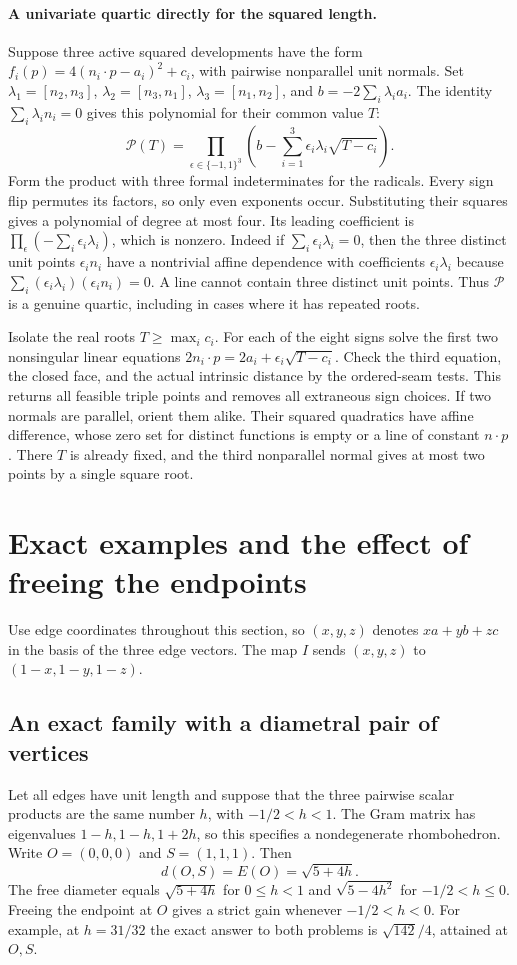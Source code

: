 \documentclass[10pt,letterpaper]{article}
\begin{document}
\paragraph{A univariate quartic directly for the squared length.}
Suppose three active squared developments have the form
$f_i(p)=4(n_i\cdot p-a_i)^2+c_i$, with pairwise nonparallel unit normals.
Set $\lambda_1=[n_2,n_3]$, $\lambda_2=[n_3,n_1]$,
$\lambda_3=[n_1,n_2]$, and $b=-2\sum_i\lambda_i a_i$. The identity
$\sum_i\lambda_i n_i=0$ gives this polynomial for their common value $T$:
\[
 \mathcal P(T)=
 \prod_{\epsilon\in\{-1,1\}^3}
 \left(b-\sum_{i=1}^3\epsilon_i\lambda_i\sqrt{T-c_i}\right).
\]
Form the product with three formal indeterminates for the radicals.
Every sign flip permutes its factors, so only even exponents occur.
Substituting their squares gives a polynomial of degree at most four.
Its leading coefficient is
$\prod_\epsilon(-\sum_i\epsilon_i\lambda_i)$, which is nonzero.
Indeed if $\sum_i\epsilon_i\lambda_i=0$, then the three distinct
unit points $\epsilon_i n_i$ have a nontrivial affine dependence
with coefficients $\epsilon_i\lambda_i$ because
$\sum_i(\epsilon_i\lambda_i)(\epsilon_i n_i)=0$. A line cannot
contain three distinct unit points. Thus $\mathcal P$ is a genuine
quartic, including in cases where it has repeated roots.

Isolate the real roots $T\ge\max_i c_i$. For each of the eight signs
solve the first two nonsingular linear equations
$2n_i\cdot p=2a_i+\epsilon_i\sqrt{T-c_i}$. Check the third equation,
the closed face, and the actual intrinsic distance by the ordered-seam
tests. This returns all feasible triple points and removes all
extraneous sign choices. If two normals are parallel, orient them alike.
Their squared quadratics have affine difference, whose zero set for
distinct functions is empty or a line of constant $n\cdot p$.
There $T$ is already fixed, and the third nonparallel normal gives
at most two points by a single square root.

\section{Exact examples and the effect of freeing the endpoints}
\label{sec:skew-examples}
Use edge coordinates throughout this section, so $(x,y,z)$ denotes
$x a+y b+z c$ in the basis of the three edge vectors. The map $I$ sends
$(x,y,z)$ to $(1-x,1-y,1-z)$.

\subsection{An exact family with a diametral pair of vertices}
Let all edges have unit length and suppose that the three pairwise scalar
products are the same number $h$, with $-1/2<h<1$. The Gram matrix has
eigenvalues $1-h,1-h,1+2h$, so this specifies a nondegenerate rhombohedron.
Write $O=(0,0,0)$ and $S=(1,1,1)$. Then
\[
 d(O,S)=E(O)=\sqrt{5+4h}.
\]
The free diameter equals $\sqrt{5+4h}$ for $0\le h<1$ and
$\sqrt{5-4h^2}$ for $-1/2<h\le0$. Freeing the endpoint at $O$ gives
a strict gain whenever $-1/2<h<0$. For example,
at $h=31/32$ the exact answer to both problems is $\sqrt{142}/4$, attained
at $O,S$.
\end{document}
